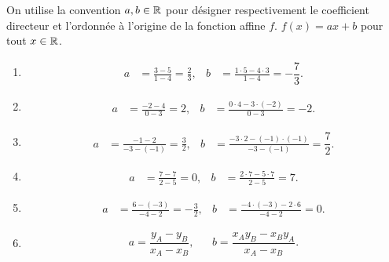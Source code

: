 {
	On utilise la convention $a, b \in \mathbb{R}$ pour désigner respectivement le coefficient directeur et l'ordonnée à l'origine de la fonction affine $f$.
	$f(x) = ax+b$ pour tout $x\in\mathbb{R}$.

	\begin{enumerate}
		 \item 
		    \begin{align*}
		        a &= \frac{3-5}{1-4} = \frac{2}{3}, & b &= \frac{1 \cdot 5 - 4 \cdot 3}{1 - 4} = -\dfrac73.
		    \end{align*}
		
		    \item 
		    \begin{align*}
		        a &= \frac{-2 - 4}{0-3} = 2, & b &= \frac{0 \cdot 4 - 3 \cdot (-2)}{0 - 3} = -2.
		    \end{align*}
		    
		    \item
		    \begin{align*}
		        a &= \frac{-1 - 2}{-3 - (-1)} = \frac{3}{2}, & b &= \frac{-3 \cdot 2 - (-1) \cdot (-1)}{-3 - (-1)} = \dfrac72.
		    \end{align*}
		
		    \item
		    \begin{align*}
		        a &= \frac{7 - 7}{2 - 5} = 0, & b &= \frac{2 \cdot 7 - 5 \cdot 7}{2 - 5} = 7.
		    \end{align*}
		
		    \item
		    \begin{align*}
		        a &= \frac{6-(-3)}{-4 - 2} = -\frac{3}{2}, & b &= \frac{-4 \cdot (-3) - 2 \cdot 6}{-4 - 2} = 0.
		    \end{align*}
		\item 
			\begin{align*}
				a = \dfrac{y_A - y_B}{x_A - x_B}, && b = \dfrac{x_A y_B - x_B y_A}{x_A - x_B}.
			\end{align*}

	\end{enumerate}


}

